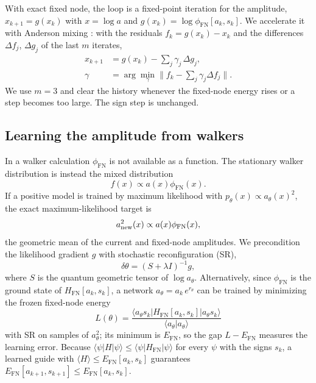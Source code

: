 \documentclass[aps,prb,reprint,onecolumn,superscriptaddress,floatfix]{revtex4-2}
\newcommand{\FN}{\mathrm{FN}}
\begin{document}
With exact fixed node, the loop is a fixed-point iteration for the amplitude,
$x_{k+1}=g(x_k)$ with $x=\log a$ and $g(x_k)=\log\phi_\FN[a_k,s_k]$. We
accelerate it with Anderson mixing \cite{Anderson1965,WalkerNi2011}: with the
residuals $f_k=g(x_k)-x_k$ and the differences $\Delta f_j$, $\Delta g_j$ of the
last $m$ iterates,
\begin{equation}
\begin{aligned}
x_{k+1}&=g(x_k)-\sum_{j}\gamma_j\,\Delta g_j,\\
\gamma&=\arg\min_\gamma\Big\|f_k-\sum_j\gamma_j\Delta f_j\Big\| .
\end{aligned}
\label{eq:anderson}
\end{equation}
We use $m=3$ and clear the history whenever the fixed-node energy rises or a
step becomes too large. The
sign step is unchanged.

\subsection{Learning the amplitude from walkers}

In a walker calculation $\phi_\FN$ is not available as a function. The
stationary walker distribution is instead the mixed distribution
\begin{equation}
f(x)\propto a(x)\phi_\FN(x) .
\label{eq:mixed}
\end{equation}
If a positive model is trained by maximum likelihood with
$p_\theta(x)\propto a_\theta(x)^2$, the exact maximum-likelihood target is
\begin{equation}
a_{\rm new}^2(x)\propto a(x)\phi_\FN(x),
\label{eq:halfstep}
\end{equation}
the geometric mean of the current and fixed-node amplitudes. We
precondition the likelihood gradient $g$ with stochastic reconfiguration
(SR),
\begin{equation}
\delta\theta=(S+\lambda I)^{-1}g ,
\label{eq:sr}
\end{equation}
where $S$ is the quantum geometric tensor of $\log a_\theta$. Alternatively,
since $\phi_\FN$ is the ground state of $H_\FN[a_k,s_k]$, a network
$a_\theta=a_k\,e^{r_\theta}$ can be trained by minimizing the frozen
fixed-node energy
\begin{equation}
L(\theta)=\frac{\langle a_\theta s_k|H_\FN[a_k,s_k]|a_\theta s_k\rangle}{\langle a_\theta|a_\theta\rangle}
\label{eq:frozen}
\end{equation}
with SR on samples of $a_\theta^2$; its minimum is $E_\FN$, so the gap
$L-E_\FN$ measures the learning error. Because
$\langle\psi|H|\psi\rangle\leq\langle\psi|H_\FN|\psi\rangle$ for every $\psi$ with the
signs $s_k$, a learned guide with $\langle H\rangle\leq E_\FN[a_k,s_k]$
guarantees $E_\FN[a_{k+1},s_{k+1}]\leq E_\FN[a_k,s_k]$.
\end{document}
